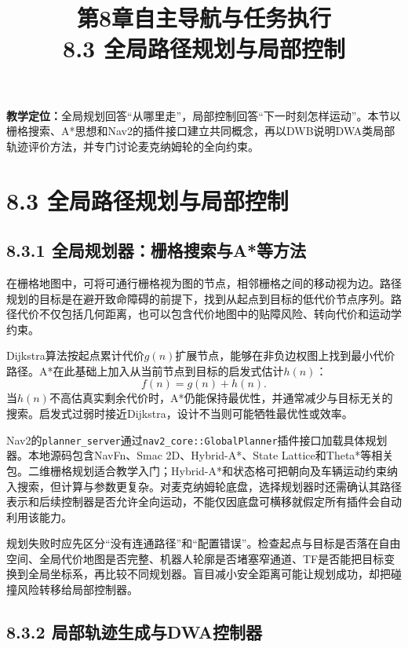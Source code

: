 \documentclass[UTF8,zihao=-4]{ctexart}
\title{第8章自主导航与任务执行\\\large 8.3 全局路径规划与局部控制}
\author{}\date{}
\begin{document}
\maketitle

\noindent\textbf{教学定位：}全局规划回答“从哪里走”，局部控制回答“下一时刻怎样运动”。本节以栅格搜索、A*思想和Nav2的插件接口建立共同概念，再以DWB说明DWA类局部轨迹评价方法，并专门讨论麦克纳姆轮的全向约束。

\section*{8.3 全局路径规划与局部控制}

\subsection*{8.3.1 全局规划器：栅格搜索与A*等方法}

在栅格地图中，可将可通行栅格视为图的节点，相邻栅格之间的移动视为边。路径规划的目标是在避开致命障碍的前提下，找到从起点到目标的低代价节点序列。路径代价不仅包括几何距离，也可以包含代价地图中的贴障风险、转向代价和运动学约束。

Dijkstra算法按起点累计代价$g(n)$扩展节点，能够在非负边权图上找到最小代价路径。A*在此基础上加入从当前节点到目标的启发式估计$h(n)$：
\begin{equation}
  f(n)=g(n)+h(n).
  \label{eq:a-star-score}
\end{equation}
当$h(n)$不高估真实剩余代价时，A*仍能保持最优性，并通常减少与目标无关的搜索。启发式过弱时接近Dijkstra，设计不当则可能牺牲最优性或效率\cite{macenski2023survey}。

Nav2的\texttt{planner\_server}通过\texttt{nav2\_core::GlobalPlanner}插件接口加载具体规划器。本地源码包含NavFn、Smac 2D、Hybrid-A*、State Lattice和Theta*等相关包。二维栅格规划适合教学入门；Hybrid-A*和状态格可把朝向及车辆运动约束纳入搜索，但计算与参数更复杂。对麦克纳姆轮底盘，选择规划器时还需确认其路径表示和后续控制器是否允许全向运动，不能仅因底盘可横移就假定所有插件会自动利用该能力。

规划失败时应先区分“没有连通路径”和“配置错误”。检查起点与目标是否落在自由空间、全局代价地图是否完整、机器人轮廓是否堵塞窄通道、TF是否能把目标变换到全局坐标系，再比较不同规划器。盲目减小安全距离可能让规划成功，却把碰撞风险转移给局部控制器。

\subsection*{8.3.2 局部轨迹生成与DWA控制器}
\end{document}

